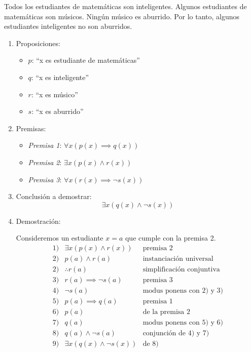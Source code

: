 \begin{fmd-example}
	Todos los estudiantes de matemáticas son inteligentes. Algunos estudiantes de matemáticas son músicos. Ningún músico es aburrido. Por lo tanto, algunos estudiantes inteligentes no son aburridos.
	
	\begin{enumerate}
		\item Proposiciones:
		\begin{itemize}[label={}]
			\item $p$: ``x es estudiante de matemáticas''
			\item $q$: ``x es inteligente''
			\item $r$: ``x es músico''
			\item $s$: ``x es aburrido''
		\end{itemize}
		\item Premisas:
		\begin{itemize}[label={}]
			\item \textit{Premisa 1}: $ \forall x \left(p(x) \implies q(x)\right) $
			\item \textit{Premisa 2}: $ \exists x \left(p(x) \land r(x) \right) $
			\item \textit{Premisa 3}: $ \forall x \left(r(x) \implies \neg s(x)\right) $
		\end{itemize}
		\item Conclusión a demostrar: \[ \exists x \left( q(x) \land \neg s(x) \right) \]
		\item Demostración:
		
		Consideremos un estudiante $x=a$ que cumple con la premisa 2.
		\[
		\begin{array}{lll}
			1) & \exists x \left( p(x) \land r(x) \right) & \text{premisa 2}\\
			2) & p(a) \land r(a) & \text{instanciación universal}\\
			2) & \therefore r(a) & \text{simplificación conjuntiva}\\
			3) & r(a) \implies \neg s(a) & \text{premisa 3} \\
			4) & \neg s(a) & \text{modus ponens con 2) y 3)} \\
			5) & p(a) \implies q(a) & \text{premisa 1} \\
			6) & p(a) & \text{de la premisa 2}\\
			7) & q(a) & \text{modus ponens con 5) y 6)}\\
			8) & q(a) \land \neg s(a) & \text{conjunción de 4) y 7)}\\
			9) & \exists x \left( q(x) \land \neg s(x) \right) & \text{de 8)}
		\end{array}
		\]
	\end{enumerate}
	
\end{fmd-example}

